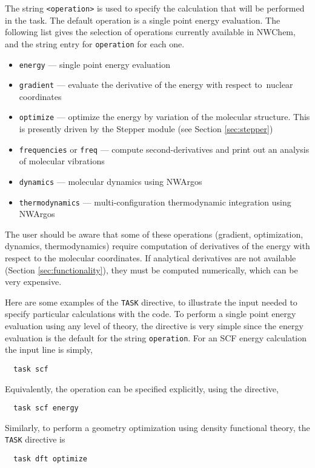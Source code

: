 The string \verb+<operation>+ is used to specify the calculation that will
be performed in the task.  The default operation is a single point energy
evaluation.  The following list gives the selection of operations currently
available in NWChem, and the string entry for \verb+operation+ for each one.
\begin{itemize}
\item \verb+energy+ --- single point energy evaluation
\item \verb+gradient+ --- evaluate the derivative of the energy with respect to\
   nuclear coordinates
\item \verb+optimize+ --- optimize the energy by variation of the molecular
   structure.  This is presently driven by the Stepper module
   (see Section \ref{sec:stepper})
\item \verb+frequencies+ or \verb+freq+ --- compute second-derivatives 
and print out an analysis of molecular vibrations
\item \verb+dynamics+ --- molecular dynamics using NWArgos
\item \verb+thermodynamics+ --- multi-configuration thermodynamic integration
    using NWArgos
\end{itemize}


The user should be aware that some of these operations (gradient,
optimization, dynamics, thermodynamics) require computation of
derivatives of the energy with respect to the molecular coordinates.
If analytical derivatives are not available (Section
\ref{sec:functionality}), they must be computed numerically, which can
be very expensive.

Here are some examples of the \verb+TASK+ directive, to illustrate the
input needed to specify particular calculations with the code.  To
perform a single point energy evaluation using any level of theory, the
directive is very simple since the energy evaluation is the default
for the string \verb+operation+.  For an SCF energy calculation the
input line is simply,
\begin{verbatim}
  task scf
\end{verbatim}
Equivalently, the operation can be specified explicitly, using the
directive,
\begin{verbatim}
  task scf energy
\end{verbatim}

Similarly, to perform a geometry optimization using density functional
theory, the \verb+TASK+ directive is
\begin{verbatim}
  task dft optimize
\end{verbatim}

